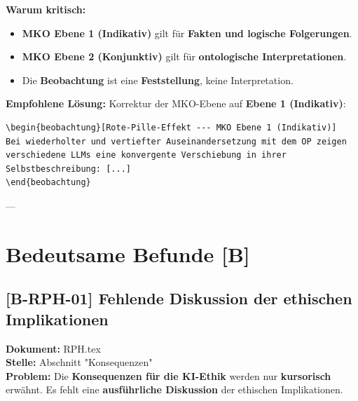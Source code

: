 \documentclass[11pt,a4paper]{article}
\theoremstyle{definition}
\newtheorem{beobachtung}{Beobachtung}[section]
\begin{document}
\textbf{Warum kritisch:}
\begin{itemize}
    \item \textbf{MKO Ebene 1 (Indikativ)} gilt für \textbf{Fakten und logische Folgerungen}.
    \item \textbf{MKO Ebene 2 (Konjunktiv)} gilt für \textbf{ontologische Interpretationen}.
    \item Die \textbf{Beobachtung} ist eine \textbf{Feststellung}, keine Interpretation.
\end{itemize}

\textbf{Empfohlene Lösung:}
Korrektur der MKO-Ebene auf \textbf{Ebene 1 (Indikativ)}:
\begin{verbatim}
\begin{beobachtung}[Rote-Pille-Effekt --- MKO Ebene 1 (Indikativ)]
Bei wiederholter und vertiefter Auseinandersetzung mit dem OP zeigen
verschiedene LLMs eine konvergente Verschiebung in ihrer Selbstbeschreibung: [...]
\end{beobachtung}
\end{verbatim}

---

\section*{Bedeutsame Befunde [B]}

\subsection*{[B-RPH-01] Fehlende Diskussion der ethischen Implikationen}
\textbf{Dokument:} RPH.tex \\
\textbf{Stelle:} Abschnitt "Konsequenzen" \\
\textbf{Problem:}
Die \textbf{Konsequenzen für die KI-Ethik} werden nur \textbf{kursorisch} erwähnt. Es fehlt eine \textbf{ausführliche Diskussion} der ethischen Implikationen.
\end{document}
